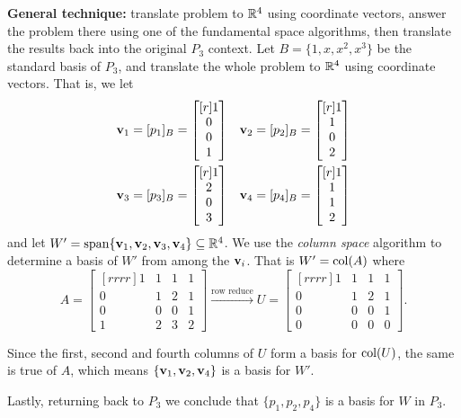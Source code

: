 \begin{solution}
\noindent
{\bf General technique:} translate problem to ${\mathbb R}^4$ using coordinate vectors, answer the problem there using one of the fundamental space algorithms, then translate the results back into the original $P_3$ context.
% 
Let $B=\{1,x,x^2,x^3\}$ be the standard basis of $P_3$, and translate the whole problem to ${\mathbb R}^4$ using coordinate vectors. That is, we let 
\begin{align*}
{\mathbf v}_1&=[p_1]_B=\begin{bmatrix}[r]
1\\0\\0\\ 1
\end{bmatrix} & {\mathbf v}_2&=[p_2]_B=\begin{bmatrix}[r]
1\\ 1 \\0 \\2
\end{bmatrix}\\
{\mathbf v}_3&=[p_3]_B=\begin{bmatrix}[r]
1\\ 2 \\ 0 \\ 3
\end{bmatrix}
&
{\mathbf v}_4&=[p_4]_B=\begin{bmatrix}[r]
1\\ 1\\ 1 \\ 2
\end{bmatrix} 
\end{align*}
and let $W'=\operatorname{span}\{{\mathbf v}_1,{\mathbf v}_2,{\mathbf v}_3,{\mathbf v}_4\}\subseteq {\mathbb R}^4$. We use the {\em column space} algorithm to determine a basis of $W'$ from among the ${\mathbf v}_i$. That is $W'=\operatorname{col}(A)$ where 
\[
A=\begin{bmatrix}[rrrr]
1&1&1&1\\ 0&1&2&1\\ 0&0&0&1\\ 1&2&3&2
\end{bmatrix}
\xrightarrow{\text{row reduce}}
U=\begin{bmatrix}[rrrr]
1&1&1&1\\0&1&2&1\\0&0&0&1\\0&0&0&0
\end{bmatrix}.
\]

Since the first, second and fourth columns of $U$ form a basis for $\operatorname{col}(U)$, the same is true of $A$, which means $\{{\mathbf v}_1,{\mathbf v}_2,{\mathbf v}_4\}$ is a basis for $W'$. 

Lastly, returning back to $P_3$ we conclude that $\{p_1,p_2,p_4\}$ is a basis for $W$ in $P_3$.  
\end{solution}
